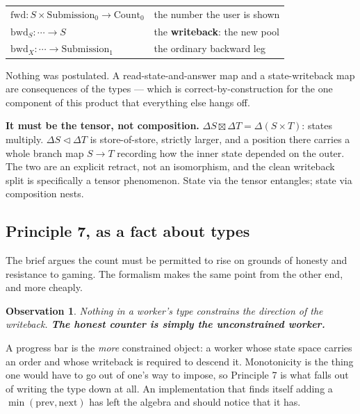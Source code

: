 \documentclass[11pt,a4paper]{article}
\newtheorem*{obs}{Observation}
\newcommand{\seq}{\mathbin{\triangleleft}}
\newcommand{\ten}{\mathbin{\boxtimes}}
\begin{document}
\begin{center}
\begin{tabular}{@{}ll@{}}
\toprule
$\mathrm{fwd} : S \times \mathrm{Submission}_0 \to \mathrm{Count}_0$
  & the number the user is shown \\
$\mathrm{bwd}_S : \cdots \to S$
  & the \textbf{writeback}: the new pool \\
$\mathrm{bwd}_X : \cdots \to \mathrm{Submission}_1$
  & the ordinary backward leg \\
\bottomrule
\end{tabular}
\end{center}

Nothing was postulated. A read-state-and-answer map and a state-writeback map are
consequences of the types --- which is correct-by-construction for the one
component of this product that everything else hangs off.

\begin{alarmbox}
\textbf{It must be the tensor, not composition.} $\Delta S \ten \Delta T =
\Delta(S \times T)$: states multiply. $\Delta S \seq \Delta T$ is
store-of-store, strictly larger, and a position there carries a whole branch map
$S \to T$ recording how the inner state depended on the outer. The two are an
explicit retract, not an isomorphism, and the clean writeback split is
specifically a tensor phenomenon. State via the tensor entangles; state via
composition nests.
\end{alarmbox}

\subsection{Principle 7, as a fact about types}

The brief argues the count must be permitted to rise on grounds of honesty and
resistance to gaming. The formalism makes the same point from the other end, and
more cheaply.

\begin{obs}
Nothing in a worker's type constrains the direction of the writeback. \textbf{The
honest counter is simply the unconstrained worker.}
\end{obs}

A progress bar is the \emph{more} constrained object: a worker whose state space
carries an order and whose writeback is required to descend it. Monotonicity is
the thing one would have to go out of one's way to impose, so Principle 7 is what
falls out of writing the type down at all. An implementation that finds itself
adding a $\min(\mathrm{prev}, \mathrm{next})$ has left the algebra and should
notice that it has.
\end{document}
